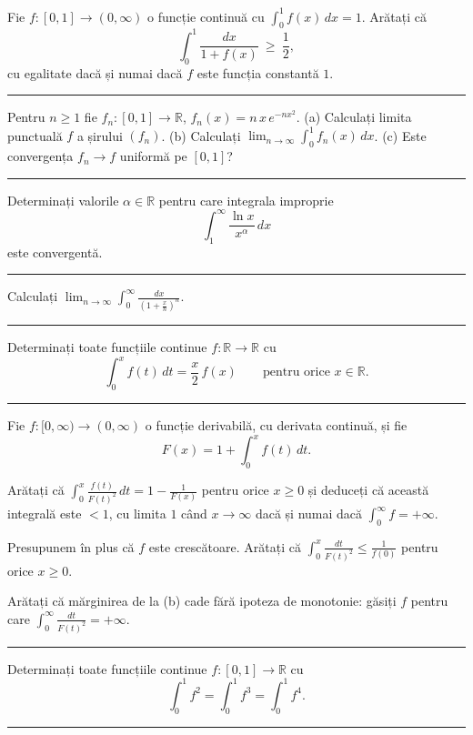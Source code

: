 Fie $f:[0,1]\to(0,\infty)$ o funcție continuă cu $\displaystyle\int_0^1 f(x)\,dx = 1$.
Arătați că
\[ \int_0^1 \frac{dx}{1+f(x)} \ \ge\ \frac12, \]
cu egalitate dacă și numai dacă $f$ este funcția constantă $1$.
\vspace{1mm}\hrule

Pentru $n\ge1$ fie $f_n:[0,1]\to\mathbb{R}$, $f_n(x)=n\,x\,e^{-nx^2}$.
(a) Calculați limita punctuală $f$ a șirului $(f_n)$.
(b) Calculați $\displaystyle\lim_{n\to\infty}\int_0^1f_n(x)\,dx$.
(c) Este convergența $f_n\to f$ uniformă pe $[0,1]$?
\vspace{1mm}\hrule

Determinați valorile $\alpha\in\mathbb{R}$ pentru care integrala improprie
\[ \int_1^\infty\frac{\ln x}{x^\alpha}\,dx \]
este convergentă.
\vspace{1mm}\hrule

Calculați $\displaystyle\lim_{n\to\infty}\int_0^\infty \frac{dx}{\left(1+\frac{x}{n}\right)^n}$.
\vspace{1mm}\hrule

Determinați toate funcțiile continue $f:\mathbb{R}\to\mathbb{R}$ cu
\[ \int_0^x f(t)\,dt=\frac{x}{2}\,f(x)\qquad\text{pentru orice }x\in\mathbb{R}. \]
\vspace{1mm}\hrule

Fie $f:[0,\infty)\to(0,\infty)$ o funcție derivabilă, cu derivata continuă, și fie
\[ F(x)=1+\int_0^{x}f(t)\,dt . \]
\begin{parti}
  \item Arătați că $\displaystyle\int_0^{x}\frac{f(t)}{F(t)^2}\,dt=1-\frac{1}{F(x)}$
        pentru orice $x\ge0$ și deduceți că această integrală este $<1$, cu limita
        $1$ când $x\to\infty$ dacă și numai dacă $\int_0^{\infty}f=+\infty$.
  \item Presupunem în plus că $f$ este crescătoare. Arătați că
        $\displaystyle\int_0^{x}\frac{dt}{F(t)^2}\le\frac{1}{f(0)}$ pentru orice $x\ge0$.
  \item Arătați că mărginirea de la (b) cade fără ipoteza de monotonie: găsiți $f$
        pentru care $\displaystyle\int_0^{\infty}\frac{dt}{F(t)^2}=+\infty$.
\end{parti}
\vspace{1mm}\hrule

Determinați toate funcțiile continue $f:[0,1]\to\mathbb{R}$ cu
\[ \int_0^1f^2=\int_0^1f^3=\int_0^1f^4 . \]
\vspace{1mm}\hrule


